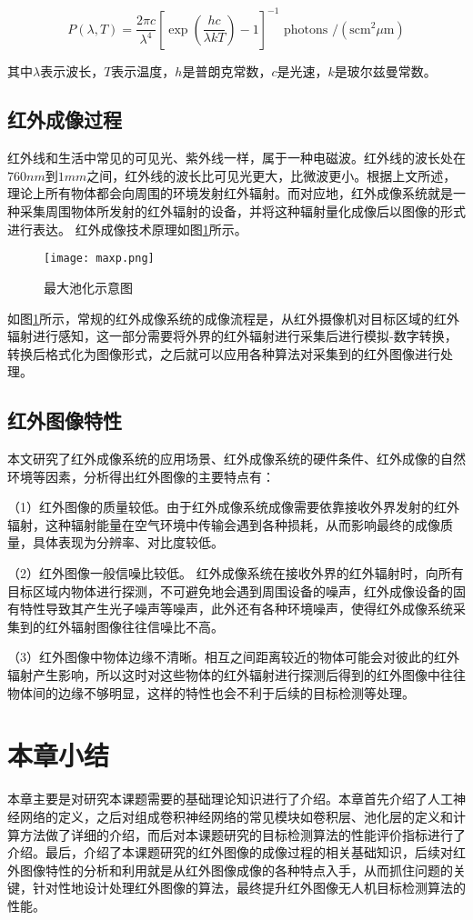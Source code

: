 \begin{equation}
    P(\lambda, T)=\frac{2 \pi c}{\lambda^{4}}\left[\exp \left(\frac{h c}{\lambda k T}\right)-1\right]^{-1} \text { photons } /\left(\mathrm{s} \mathrm{cm}^{2} \mu \mathrm{m}\right)
    \label{plank2}    
\end{equation}

其中$\lambda$表示波长，$T$表示温度，$h$是普朗克常数，$c$是光速，$k$是玻尔兹曼常数。

\subsection{红外成像过程}

红外线和生活中常见的可见光、紫外线一样，属于一种电磁波。红外线的波长处在$760nm$到$1mm$之间，红外线的波长比可见光更大，比微波更小。根据上文所述，理论上所有物体都会向周围的环境发射红外辐射。而对应地，红外成像系统就是一种采集周围物体所发射的红外辐射的设备，并将这种辐射量化成像后以图像的形式进行表达。
红外成像技术原理如图\ref{infra}所示\cite{倪国强2008中国红外成像技术发展的若干思考}。

\begin{figure}[htbp]
    \centering
    \texttt{[image: maxp.png]}
    \caption{最大池化示意图}
    \label{infra}
\end{figure}

如图\ref{infra}所示，常规的红外成像系统的成像流程是，从红外摄像机对目标区域的红外辐射进行感知，这一部分需要将外界的红外辐射进行采集后进行模拟-数字转换，转换后格式化为图像形式，之后就可以应用各种算法对采集到的红外图像进行处理。

\subsection{红外图像特性} 

本文研究了红外成像系统的应用场景、红外成像系统的硬件条件、红外成像的自然环境等因素，分析得出红外图像的主要特点有：

（1）红外图像的质量较低。由于红外成像系统成像需要依靠接收外界发射的红外辐射，这种辐射能量在空气环境中传输会遇到各种损耗，从而影响最终的成像质量，具体表现为分辨率、对比度较低。

（2）红外图像一般信噪比较低。
红外成像系统在接收外界的红外辐射时，向所有目标区域内物体进行探测，不可避免地会遇到周围设备的噪声，红外成像设备的固有特性导致其产生光子噪声等噪声，此外还有各种环境噪声，使得红外成像系统采集到的红外辐射图像往往信噪比不高。

（3）红外图像中物体边缘不清晰。相互之间距离较近的物体可能会对彼此的红外辐射产生影响，所以这时对这些物体的红外辐射进行探测后得到的红外图像中往往物体间的边缘不够明显，这样的特性也会不利于后续的目标检测等处理。

\section{本章小结}
本章主要是对研究本课题需要的基础理论知识进行了介绍。本章首先介绍了人工神经网络的定义，之后对组成卷积神经网络的常见模块如卷积层、池化层的定义和计算方法做了详细的介绍，而后对本课题研究的目标检测算法的性能评价指标进行了介绍。最后，介绍了本课题研究的红外图像的成像过程的相关基础知识，后续对红外图像特性的分析和利用就是从红外图像成像的各种特点入手，从而抓住问题的关键，针对性地设计处理红外图像的算法，最终提升红外图像无人机目标检测算法的性能。


